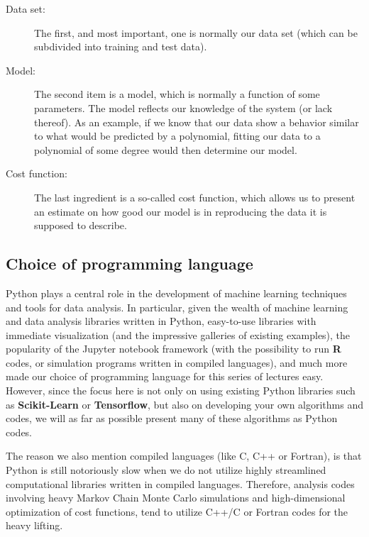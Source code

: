 \documentclass[%
oneside,                 %
final,                   %
10pt]{article}
\begin{document}
\begin{description}
\item[Data set:] 
  The first, and most important, one is normally our data set (which can be subdivided into training and test data). 

\item[Model:] 
  The second item is a model, which is normally a function of some parameters. The model reflects our knowledge of the system (or lack thereof). As an example, if we know that our data show a behavior similar to what would be predicted by a polynomial, fitting our data to a polynomial of some degree would then determine our model. 

\item[Cost function:] 
  The last ingredient is a so-called cost function, which allows us to present an estimate on how good our model is in reproducing the data it is supposed to describe.  
\end{description}

\noindent
\subsection{Choice of programming language}

Python plays a central role in the development of machine
learning techniques and tools for data analysis. In particular, given
the wealth of machine learning and data analysis libraries written in
Python, easy-to-use libraries with immediate visualization (and the
impressive galleries of existing examples), the popularity of the
Jupyter notebook framework (with the possibility to run \textbf{R} codes, or
simulation programs written in compiled languages), and much more made our choice of
programming language for this series of lectures easy. However,
since the focus here is not only on using existing Python libraries such
as \textbf{Scikit-Learn} or \textbf{Tensorflow}, but also on developing your own
algorithms and codes, we will as far as possible present many of these
algorithms as Python codes. 

The reason we also  mention compiled languages (like C, C++ or
Fortran), is that Python is still notoriously slow when we do not
utilize highly streamlined computational libraries 
written in compiled languages.  Therefore, analysis codes involving heavy Markov Chain Monte Carlo simulations and high-dimensional optimization of cost functions, tend to utilize C++/C or Fortran codes for the heavy lifting.
\end{document}
